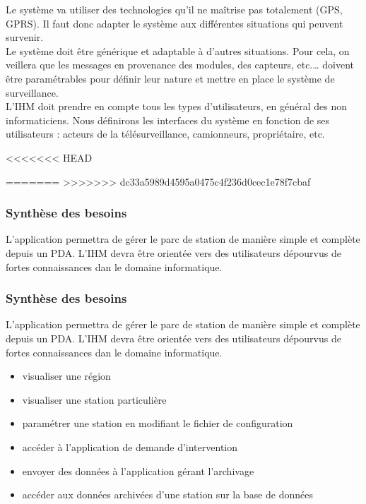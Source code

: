 Le système va utiliser des technologies qu'il ne maîtrise pas totalement (GPS, GPRS). Il faut donc 
adapter le système aux différentes situations qui peuvent survenir.\\

Le système doit être générique et adaptable à d’autres situations. Pour cela, on veillera que les 
messages en provenance des modules, des capteurs, etc.… doivent être paramétrables pour définir 
leur nature et mettre en place le système de surveillance.\\

L'IHM doit prendre en compte tous les types d'utilisateurs, en général des non informaticiens. 
Nous définirons les interfaces du système en fonction de ses utilisateurs : 
acteurs de la télésurveillance, camionneurs, propriétaire, etc.
 

<<<<<<< HEAD


=======
>>>>>>> dc33a5989d4595a0475c4f236d0cec1e78f7cbaf
\subsubsection{Synthèse des besoins}
L'application permettra de gérer le parc de station de manière simple et complète depuis un PDA. 
L'IHM devra être orientée vers des utilisateurs dépourvus de fortes connaissances dan le domaine informatique.\\

\subsubsection{Synthèse des besoins}
L'application permettra de gérer le parc de station de manière simple et complète depuis un PDA. L'IHM devra être orientée vers des utilisateurs dépourvus de fortes connaissances dan le domaine informatique.\\


\begin{itemize}
\item   visualiser une région \\
\item	visualiser une station particulière \\
\item	paramétrer une station en modifiant le fichier de configuration \\
\item	accéder à l'application de demande d'intervention \\
\item	envoyer des données à l'application gérant l'archivage\\ 
\item	accéder aux données archivées d'une station sur la base de données\\
\end{itemize}


